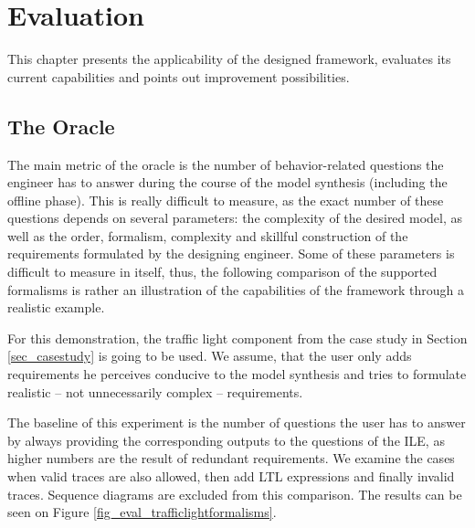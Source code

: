 \chapter{Evaluation}
This chapter presents the applicability of the designed framework, evaluates its current capabilities and points out improvement possibilities.

\section{The Oracle} \label{subs_evaloracle}
The main metric of the oracle is the number of behavior-related questions the engineer has to answer during the course of the model synthesis (including the offline phase). This is really difficult to measure, as the exact number of these questions depends on several parameters: the complexity of the desired model, as well as the order, formalism, complexity and skillful construction of the requirements formulated by the designing engineer. Some of these parameters is difficult to measure in itself, thus, the following comparison of the supported formalisms is rather an illustration of the capabilities of the framework through a realistic example. 

For this demonstration, the traffic light component from the case study in Section \ref{sec_casestudy} is going to be used. We assume, that the user only adds requirements he perceives conducive to the model synthesis and tries to formulate realistic -- not unnecessarily complex -- requirements. 

The baseline of this experiment is the number of questions the user has to answer by always providing the corresponding outputs to the questions of the ILE, as higher numbers are the result of redundant requirements. We examine the cases when valid traces are also allowed, then add LTL expressions and finally invalid traces. Sequence diagrams are excluded from this comparison. The results can be seen on Figure \ref{fig_eval_trafficlightformalisms}.

